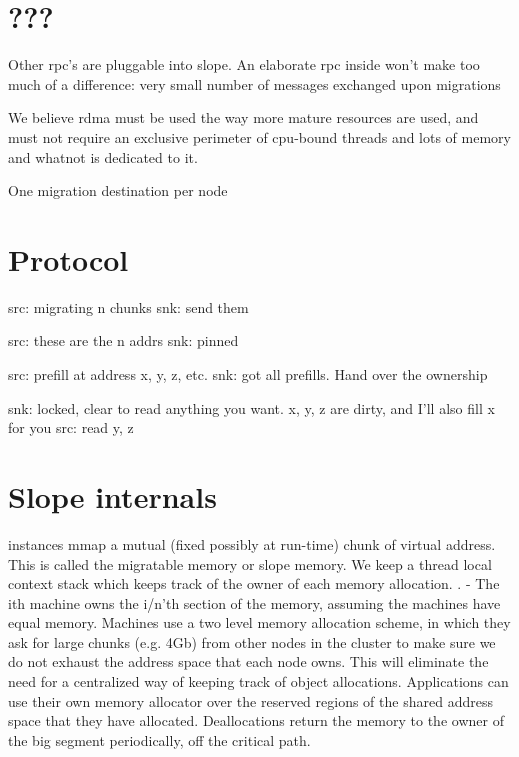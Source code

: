 \section{???}

Other rpc's are pluggable into slope.
An elaborate rpc inside won't make too much of a difference: very small number of messages exchanged upon migrations

We believe rdma must be used the way more mature resources are used, and must not require an exclusive perimeter of cpu-bound threads and lots of memory and whatnot is dedicated to it.

One migration destination per node

\section{Protocol}
src: migrating n chunks
snk: send them

src: these are the n addrs
snk: pinned

src: prefill at address x, y, z, etc.
snk: got all prefills. Hand over the ownership

snk: locked, clear to read anything you want. x, y, z are dirty, and I'll also fill x for you
src: read y, z


\section{Slope internals}

instances mmap a mutual (fixed possibly at run-time) chunk of virtual address. This is called the migratable memory or slope memory.
We keep a thread local context stack which keeps track of the owner of each memory allocation. .
- The ith machine owns the i/n'th section of the memory, assuming the machines have equal memory. Machines use a two level memory
allocation scheme, in which they ask for large chunks (e.g. 4Gb) from other nodes in the cluster to make sure we do not exhaust
the address space that each node owns. This will eliminate the need for a centralized way of keeping track of object allocations.
Applications can use their own memory allocator over the reserved regions of the shared address space that they have allocated.
Deallocations return the memory to the owner of the big segment periodically, off the critical path. 

